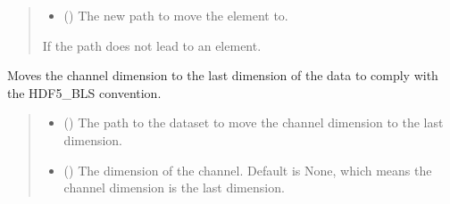 \documentclass[letterpaper,10pt,english]{sphinxmanual}
\begin{document}
\begin{fulllineitems}
\begin{fulllineitems}
\begin{quote}
\begin{description}
\begin{itemize}
\item {} 
\sphinxAtStartPar
{} () \textendash{} The new path to move the element to.

\end{itemize}

\sphinxAtStartPar
{} \textendash{} If the path does not lead to an element.

\end{description}\end{quote}

\end{fulllineitems}


\begin{fulllineitems}
\label{\detokenize{_autosummary/HDF5_BLS.wrapper:HDF5_BLS.wrapper.Wrapper.move_channel_dimension_to_last}}
\pysigstartsignatures
\pysiglinewithargsret
{}
{\sphinxparamcomma {}}
{}
\pysigstopsignatures
\sphinxAtStartPar
Moves the channel dimension to the last dimension of the data to comply with the HDF5\_BLS convention.
\begin{quote}\begin{description}
\begin{itemize}
\item {} 
\sphinxAtStartPar
{} () \textendash{} The path to the dataset to move the channel dimension to the last dimension.

\item {} 
\sphinxAtStartPar
{} (\sphinxstyleliteralemphasis{\sphinxupquote{, }}) \textendash{} The dimension of the channel. Default is None, which means the channel dimension is the last dimension.

\end{itemize}


\end{description}
\end{quote}
\end{fulllineitems}
\end{fulllineitems}
\end{document}
